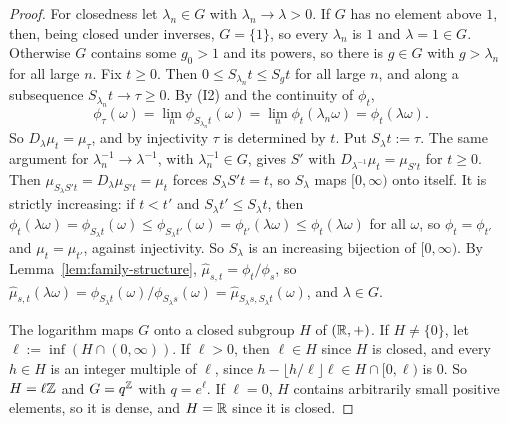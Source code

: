 \begin{proof}
For closedness let $\lambda_n \in G$ with $\lambda_n \to \lambda > 0$. If $G$ has no element
above $1$, then, being closed under inverses, $G = \{1\}$, so every $\lambda_n$ is $1$ and
$\lambda = 1 \in G$. Otherwise $G$ contains some $g_0 > 1$ and its powers, so there is $g \in G$ with
$g > \lambda_n$ for all large $n$. Fix $t \ge 0$. Then $0 \le S_{\lambda_n}t \le S_gt$ for all
large $n$, and along a subsequence $S_{\lambda_n}t \to \tau \ge 0$. By (I2) and the continuity of
$\phi_t$,
\[
  \phi_\tau(\omega) = \lim_n\phi_{S_{\lambda_n}t}(\omega) = \lim_n\phi_t(\lambda_n\omega) = \phi_t(\lambda\omega).
\]
So $D_\lambda\mu_t = \mu_\tau$, and by injectivity $\tau$ is determined by $t$. Put
$S_\lambda t := \tau$. The same argument for $\lambda_n^{-1} \to \lambda^{-1}$, with
$\lambda_n^{-1} \in G$, gives $S'$ with $D_{\lambda^{-1}}\mu_t = \mu_{S't}$ for $t \ge 0$. Then
$\mu_{S_\lambda S't} = D_\lambda\mu_{S't} = \mu_t$ forces $S_\lambda S't = t$, so $S_\lambda$ maps
$[0,\infty)$ onto itself. It is strictly increasing: if $t < t'$ and $S_\lambda t' \le S_\lambda t$,
then
$\phi_t(\lambda\omega) = \phi_{S_\lambda t}(\omega) \le \phi_{S_\lambda t'}(\omega) = \phi_{t'}(\lambda\omega)
\le \phi_t(\lambda\omega)$ for all $\omega$, so $\phi_t = \phi_{t'}$ and $\mu_t = \mu_{t'}$, against
injectivity. So $S_\lambda$ is an increasing bijection of $[0,\infty)$. By
Lemma~\ref{lem:family-structure},
$\widehat\mu_{s,t} = \phi_t/\phi_s$, so
$\widehat\mu_{s,t}(\lambda\omega) = \phi_{S_\lambda t}(\omega)/\phi_{S_\lambda s}(\omega) =
\widehat\mu_{S_\lambda s, S_\lambda t}(\omega)$, and $\lambda \in G$.

The logarithm maps $G$ onto a closed subgroup $H$ of $(\mathbb{R}, +)$. If $H \ne \{0\}$, let
$\ell := \inf(H \cap (0,\infty))$. If $\ell > 0$, then $\ell \in H$ since $H$ is closed, and every
$h \in H$ is an integer multiple of $\ell$, since $h - \lfloor h/\ell\rfloor\ell \in H \cap [0,\ell)$
is $0$. So $H = \ell\mathbb{Z}$ and $G = q^{\mathbb{Z}}$ with $q = e^\ell$. If $\ell = 0$, $H$ contains arbitrarily
small positive elements, so it is dense, and $H = \mathbb{R}$ since it is closed.


\end{proof}
